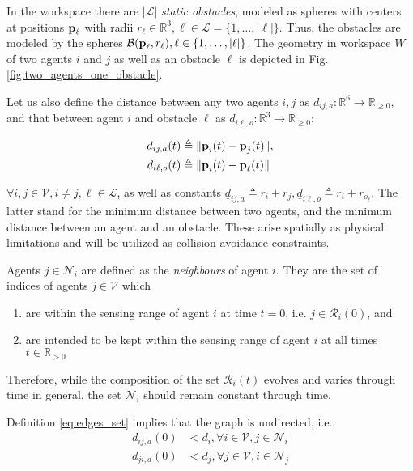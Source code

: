 In the workspace there are $|\mathcal{L}|$ \textit{static obstacles}, modeled as
spheres with centers at positions $\bm{\mathbf{p}}_{\ell}$ with radii
$r_{\ell}\in \mathbb{R}^3, \ell \in \mathcal{L} = \{1,\dots,|\mathcal{\ell}| \}$.
Thus, the obstacles are modeled by the spheres
$\mathcal{B}(\bm{\mathbf{p}}_{\ell}, r_{\ell}), \ell \in \{1,\dots,|\mathcal{\ell}|\}$. The geometry in
workspace $W$ of two agents $i$ and $j$ as well as an obstacle $\ell$ is depicted
in Fig. \ref{fig:two_agents_one_obstacle}.

Let us also define the distance between any two agents $i,j$ as
$d_{ij,a}: \mathbb{R}^6 \to \mathbb{R}_{\geq 0}$, and that between agent $i$
and obstacle $\ell$ as $d_{i\ell,o} : \mathbb{R}^3 \to \mathbb{R}_{\geq 0}$:

\begin{subequations}
	\begin{align}
    d_{ij,a}(t) &\triangleq \| \bm{\mathbf{p}}_i(t) - \bm{\mathbf{p}}_j(t) \|, \\
    d_{i\ell,o}(t) &\triangleq \| \bm{\mathbf{p}}_i(t) - \bm{\mathbf{p}}_\ell(t) \|
	\end{align}
\end{subequations}

$\forall i, j \in \mathcal{V}, i \neq j, \ell \in \mathcal{L}$, as well as
constants $\underline{d}_{ij, a} \triangleq r_{i} + r_{j},
\underline{d}_{i\ell, o} \triangleq r_{i} + r_{o_\ell}$. The latter stand for
the minimum distance between two agents, and the minimum distance between an
agent and an obstacle. These arise spatially as physical limitations and will
be utilized as collision-avoidance constraints.

Agents $j \in \mathcal{N}_i$ are defined as the \textit{neighbours} of
agent $i$. They are the set of indices of agents $j \in \mathcal{V}$ which

\begin{enumerate}
  \item are within the sensing range of agent $i$ at time $t=0$, i.e.
    $j \in \mathcal{R}_i(0)$, and
  \item are intended to be kept within the sensing range of agent $i$ at all
    times $t \in \mathbb{R}_{> 0}$
\end{enumerate}

Therefore, while the composition of the set $\mathcal{R}_i(t)$ evolves and
varies through time in general, the set $\mathcal{N}_i$ should remain
constant through time.

Definition \eqref{eq:edges_set} implies that the graph is undirected, i.e.,
\begin{align}
  d_{ij,a}(0) &< d_i, \forall i \in \mathcal{V}, j \in \mathcal{N}_i \label{eq:initially_connected_0} \\
  d_{ji,a}(0) &< d_j, \forall j \in \mathcal{V}, i \in \mathcal{N}_j \label{eq:initially_connected_1}
\end{align}

